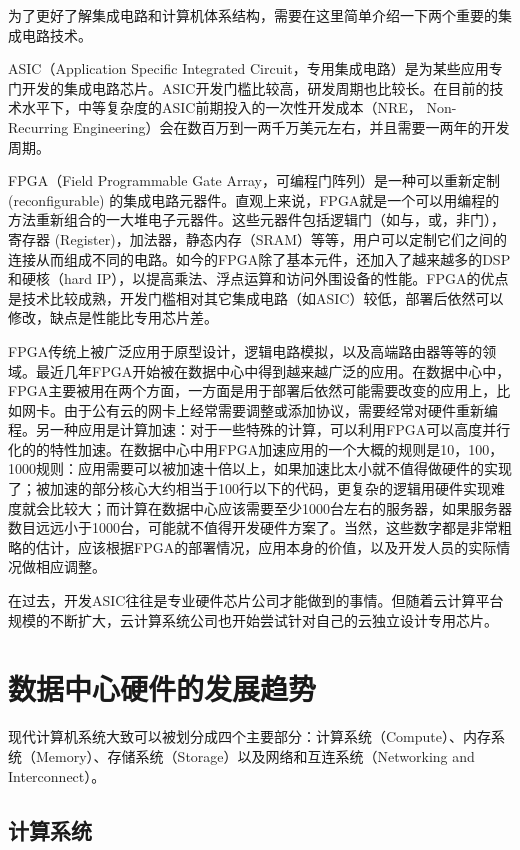 为了更好了解集成电路和计算机体系结构，需要在这里简单介绍一下两个重要的集成电路技术。

ASIC（Application Specific Integrated Circuit，专用集成电路）是为某些应用专门开发的集成电路芯片。ASIC开发门槛比较高，研发周期也比较长。在目前的技术水平下，中等复杂度的ASIC前期投入的一次性开发成本（NRE， Non-Recurring Engineering）会在数百万到一两千万美元左右，并且需要一两年的开发周期。

FPGA（Field Programmable Gate Array，可编程门阵列）是一种可以重新定制 (reconfigurable) 的集成电路元器件。直观上来说，FPGA就是一个可以用编程的方法重新组合的一大堆电子元器件。这些元器件包括逻辑门（如与，或，非门），寄存器 (Register)，加法器，静态内存（SRAM）等等，用户可以定制它们之间的连接从而组成不同的电路。如今的FPGA除了基本元件，还加入了越来越多的DSP和硬核（hard IP），以提高乘法、浮点运算和访问外围设备的性能。FPGA的优点是技术比较成熟，开发门槛相对其它集成电路（如ASIC）较低，部署后依然可以修改，缺点是性能比专用芯片差。

FPGA传统上被广泛应用于原型设计，逻辑电路模拟，以及高端路由器等等的领域。最近几年FPGA开始被在数据中心中得到越来越广泛的应用。在数据中心中，FPGA主要被用在两个方面，一方面是用于部署后依然可能需要改变的应用上，比如网卡。由于公有云的网卡上经常需要调整或添加协议，需要经常对硬件重新编程。另一种应用是计算加速：对于一些特殊的计算，可以利用FPGA可以高度并行化的的特性加速。在数据中心中用FPGA加速应用的一个大概的规则是10，100，1000规则：应用需要可以被加速十倍以上，如果加速比太小就不值得做硬件的实现了；被加速的部分核心大约相当于100行以下的代码，更复杂的逻辑用硬件实现难度就会比较大；而计算在数据中心应该需要至少1000台左右的服务器，如果服务器数目远远小于1000台，可能就不值得开发硬件方案了。当然，这些数字都是非常粗略的估计，应该根据FPGA的部署情况，应用本身的价值，以及开发人员的实际情况做相应调整。

在过去，开发ASIC往往是专业硬件芯片公司才能做到的事情。但随着云计算平台规模的不断扩大，云计算系统公司也开始尝试针对自己的云独立设计专用芯片。
\fi

\section{数据中心硬件的发展趋势}
\label{background:sec:hardware}



现代计算机系统大致可以被划分成四个主要部分：计算系统（Compute）、内存系统（Memory）、存储系统（Storage）以及网络和互连系统（Networking and Interconnect）。


\subsection{计算系统}

